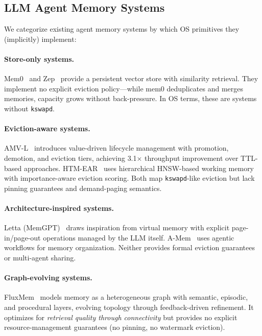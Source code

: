 \documentclass[10pt,twocolumn]{article}
\begin{document}
\subsection{LLM Agent Memory Systems}

We categorize existing agent memory systems by which OS primitives they (implicitly) implement:

\paragraph{Store-only systems.} Mem0~\cite{mem0} and Zep~\cite{zep2024} provide a persistent vector store with similarity retrieval. They implement no explicit eviction policy---while mem0 deduplicates and merges memories, capacity grows without back-pressure. In OS terms, these are systems without \texttt{kswapd}.

\paragraph{Eviction-aware systems.} AMV-L~\cite{amvl2026} introduces value-driven lifecycle management with promotion, demotion, and eviction tiers, achieving 3.1$\times$ throughput improvement over TTL-based approaches. HTM-EAR~\cite{htmear2026} uses hierarchical HNSW-based working memory with importance-aware eviction scoring. Both map \texttt{kswapd}-like eviction but lack pinning guarantees and demand-paging semantics.

\paragraph{Architecture-inspired systems.} Letta (MemGPT)~\cite{memgpt2023} draws inspiration from virtual memory with explicit page-in/page-out operations managed by the LLM itself. A-Mem~\cite{amem2025} uses agentic workflows for memory organization. Neither provides formal eviction guarantees or multi-agent sharing.

\paragraph{Graph-evolving systems.} FluxMem~\cite{fluxmem2026} models memory as a heterogeneous graph with semantic, episodic, and procedural layers, evolving topology through feedback-driven refinement. It optimizes for \emph{retrieval quality through connectivity} but provides no explicit resource-management guarantees (no pinning, no watermark eviction).
\end{document}
